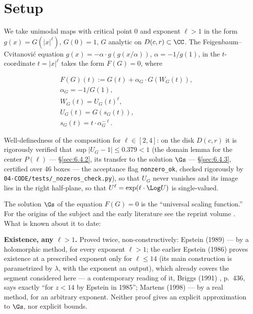 \section{Setup}
\label{sec:1}

We take unimodal maps with critical point $0$ and exponent $\ell>1$ in the
form $g(x) = G(|x|^\ell)$, $G(0) = 1$, $G$ analytic on $D(c,r) \subset \CC$. The
Feigenbaum--Cvitanović equation \cite{feigenbaum1978quantitative, feigenbaum1979universal, coullet1978iterations} $g(x) = -\alpha \cdot g(g(x/\alpha))$, $\alpha = -1/g(1)$, in the
$t$-coordinate $t = |x|^\ell$ takes the form $F(G) = 0$, where

\begin{gather*}
F(G)(t) := G(t) + \alpha_G \cdot G(W_G(t)), \\
\alpha_G = -1/G(1), \\
W_G(t) = U_G(t)^{\ell}, \\
U_G(t) = G(s_G(t)), \\
s_G(t) = t \cdot \alpha_G^{-\ell}.
\end{gather*}

Well-definedness of the composition for $\ell \in [2, 4]$: on the disk $D(c,r)$ it is rigorously
verified that $\sup |U_G - 1| \le 0.379 < 1$ (the domain lemma for the center $P(\ell)$ --- \S\ref{sec:6.4.2}, its
transfer to the solution $\Gs$ --- \S\ref{sec:6.4.3}, certified over 46 boxes --- the acceptance
flag \texttt{nonzero\_ok}, checked rigorously by
\texttt{04-\allowbreak CODE/\allowbreak tests/\allowbreak \_\allowbreak nozeros\_\allowbreak check.py}), so that $U_G$ never vanishes and its image lies in the right half-plane, so
that $U^{\ell} = \exp(\ell \cdot \Log U)$ is single-valued.

The solution $\Gs$ of the equation $F(G) = 0$ is the ``universal scaling
function.'' For the origins of the subject and the early literature see the reprint volume \cite{cvitanovic1989universality}. What is known about it to date:

\textbf{Existence, any $\ell > 1$.} Proved twice, non-constructively:
Epstein (1989) \cite{epstein1989fixed} --- by a holomorphic method, for every
exponent $\ell > 1$; the earlier Epstein (1986) \cite{epstein1986new} proves
existence at a prescribed exponent only for $\ell \le 14$ (its main construction is
parametrized by $\lambda$, with the exponent an output), which already covers the
segment considered here --- a contemporary reading of it, Briggs (1991)
\cite{briggs1991precise}, p.~436, says exactly ``for $z < 14$ by Epstein in 1985'';
Martens (1998) \cite{martens1998periodic} --- by a real method, for an arbitrary exponent.
Neither proof gives an explicit approximation to $\Gs$, nor explicit
bounds.

